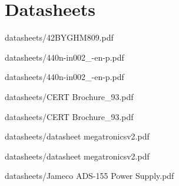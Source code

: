 \section{Datasheets} 


            {datasheets/42BYGHM809.pdf}


            {datasheets/440n-in002_-en-p.pdf}


            {datasheets/440n-in002_-en-p.pdf}


            {datasheets/CERT Brochure_93.pdf}


            {datasheets/CERT Brochure_93.pdf}


            {datasheets/datasheet megatronicsv2.pdf}


            {datasheets/datasheet megatronicsv2.pdf}


            {datasheets/Jameco ADS-155 Power Supply.pdf}

